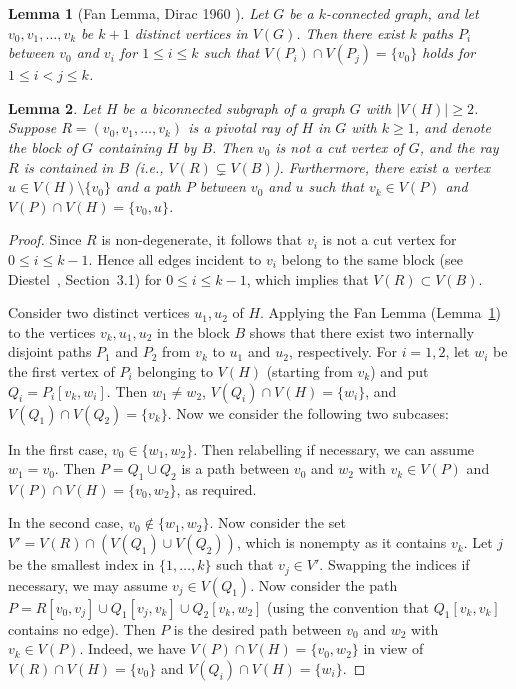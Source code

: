 \documentclass[pdflatex,sn-mathphys-num]{sn-jnl}
\theoremstyle{thmstyleone}%
\theoremstyle{thmstyletwo}%
\newtheorem{lemma}{Lemma}
\theoremstyle{thmstylethree}%
\begin{document}
\begin{lemma}[Fan Lemma, Dirac 1960 \cite{Dirac1960}]\label{lmm:fan}
Let $G$ be a $k$-connected graph, and let
$v_0,v_1, \ldots, v_k$ be $k+1$ distinct vertices in $V(G)$. Then there exist $k$ paths $P_i$ between $v_0$ and $v_i$ for $1\le i \le k$ such that $V(P_i)\cap V(P_j)=\{v_0\}$ holds for $1\le i <j\le k$.
\end{lemma}




\begin{lemma}\label{lmm:cutvis-block}
Let $H$ be a biconnected subgraph of a graph $G$ with $|V(H)|\ge 2$. 
Suppose $R=(v_0,v_1,\dots,v_k)$ is a pivotal ray of $H$ in $G$ with $k\ge 1$, and denote the block of $G$ containing $H$ by $B$.
Then $v_0$ is not a cut vertex of $G$, and the ray $R$ is contained in $B$ (i.e., $V(R)\subsetneq V(B)$). 
Furthermore, there exist a vertex $u\in V(H)\setminus\{v_0\}$ and a path $P$ between $v_0$ and $u$ such that $v_k\in V(P)$ and $V(P)\cap V(H)=\{v_0,u\}$.

\end{lemma}

\begin{proof}
Since $R$ is non-degenerate, it follows that $v_i$ is not a cut vertex for $0\le i \le k-1$. Hence all edges incident to $v_i$ belong to the same block (see Diestel~\cite{Diestel}, Section~3.1) for $0\le i \le k-1$, which implies that $V(R)\subset V(B)$.

Consider two distinct vertices $u_1,u_2$ of $H$. Applying the Fan Lemma (Lemma~\ref{lmm:fan}) to the vertices $v_k,u_1,u_2$ in the block $B$ shows that there exist two internally disjoint paths $P_1$ and $P_2$ from $v_k$ to $u_1$ and $u_2$, respectively.
For $i=1,2$, let $w_i$ be the first vertex of $P_i$ belonging to $V(H)$ (starting from $v_k$) and put $Q_i=P_i[v_k,w_i]$. Then $w_1\neq w_2$, $V(Q_i)\cap V(H)=\{w_i\}$, and $V(Q_1)\cap V(Q_2)=\{v_k\}$. Now we consider the following two subcases:


In the first case, $v_0\in \{w_1,w_2\}$. Then relabelling if necessary, we can assume $w_1=v_0$.
Then $P=Q_1\cup Q_2$ is a path between $v_0$ and $w_2$ with $v_k\in V(P)$ and $V(P)\cap V(H)=\{v_0,w_2\}$, as required.

In the second case, $v_0\not \in \{w_1,w_2\}$. 
Now consider the set 
$V'=V(R)\cap (V(Q_1)\cup V(Q_2))$, which is nonempty as it contains $v_k$. 
Let $j$ be the smallest index in $\{1,\dots,k\}$ such that $v_j\in V'$.
Swapping the indices if necessary, we may assume $v_j\in V(Q_1)$.
Now consider the path $P=R[v_0,v_j]\cup Q_1[v_j,v_k]\cup Q_2[v_k,w_2]$ (using the convention that $Q_1[v_k,v_k]$ contains no edge).
Then 
$P$ is the desired path between $v_0$ and $w_2$ with $v_k\in V(P)$. Indeed, we have $V(P)\cap V(H)=\{v_0,w_2\}$ in view of $V(R)\cap V(H)=\{v_0\}$ and $V(Q_i)\cap V(H)=\{w_i\}$.
\end{proof}
\end{document}
